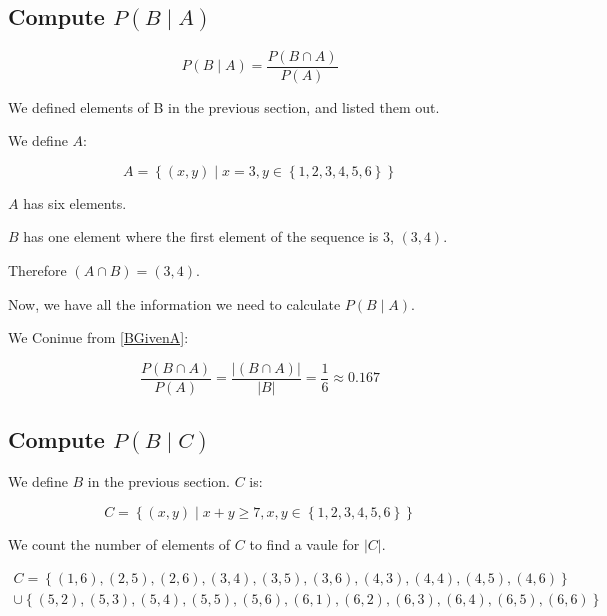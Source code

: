 \documentclass[a4paper,11pt]{article}
\begin{document}
\label{defs}
\subsection{Compute $P \left( B \mid A \right)$} 

\begin{equation}  
  P \left( B \mid A \right) =
  \frac {P \left( B \cap A \right) } { P \left( A \right) }
\end{equation}

We defined elements of B in the previous section, and listed them out.

We define $A$:

\begin{equation} \label{BGivenA}
  A = \left\{ \left(x, y \right) \mid x = 3, y \in 
    \left\{ 1, 2, 3, 4, 5, 6 \right\} \right\}
\end{equation}

$A$ has six elements.

$B$ has one element where the first element of the sequence is $3$,
$\left(3, 4 \right)$.

Therefore $\left( A \cap B \right) = \left( 3,4 \right)$.{}

Now, we have all the information we need to calculate 
$P \left( B \mid A \right)$.{}

We Coninue from \ref{BGivenA}:

\begin{equation}  
  \frac {P \left( B \cap A \right) } { P \left( A \right) } =
  \frac {\left| \left( B \cap A \right) \right|}
    {\left| B \right|} = \frac{1}{6} \approx 0.167
\end{equation}

\subsection{Compute $P\left( B \mid C \right)$}

We define $B$ in the previous section.  $C$ is:

\begin{equation}
  C = \left\{ \left( x, y \right) \mid x + y \geq 7, x,y \in{}
    \left\{ 1, 2, 3, 4, 5, 6 \right\} \right\}
\end{equation}

We count the number of elements of $C$ to find a vaule for 
$\left| C \right|$.

\begin{multline}
  C = \left\{ \left( 1, 6 \right),
    \left( 2, 5 \right),
    \left( 2, 6 \right),
    \left( 3, 4 \right),
    \left( 3, 5 \right),
    \left( 3, 6 \right),
    \left( 4, 3 \right),
    \left( 4, 4 \right),
    \left( 4, 5 \right),
    \left( 4, 6 \right)\right\} \\ \cup \left\{ \left( 5, 2 \right),
    \left( 5, 3 \right),
    \left( 5, 4 \right),
    \left( 5, 5 \right),
    \left( 5, 6 \right),
    \left( 6, 1 \right),
    \left( 6, 2 \right),
    \left( 6, 3 \right),
    \left( 6, 4 \right),
    \left( 6, 5 \right),
    \left( 6, 6 \right) \right\}
\end{multline}
\end{document}
